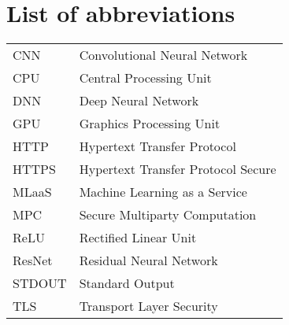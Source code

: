 \chapter*{List of abbreviations}
\begin{table}[!h]
	\begin{tabular}{ll}
		CNN			&	Convolutional Neural Network\\
		CPU			& Central Processing Unit\\
		DNN 		&	Deep Neural Network\\
		GPU 		&	Graphics Processing Unit\\
		HTTP		&	Hypertext Transfer Protocol\\
		HTTPS		&	Hypertext Transfer Protocol Secure\\
		MLaaS		&	Machine Learning as a Service\\
		MPC			&	Secure Multiparty Computation\\
		ReLU		&	Rectified Linear Unit\\
		ResNet	&	Residual Neural Network\\
		STDOUT	&	Standard Output\\
		TLS			&	Transport Layer Security\\
	\end{tabular}
\end{table}
